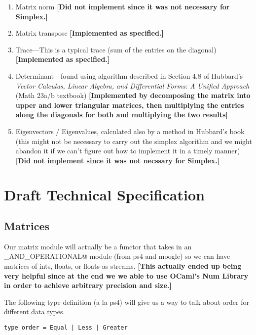 \documentclass[letterpaper,11pt]{article}
\newcommand{\annot}[1]{\textbf{\color{BrickRed} [#1]}}
\begin{document}
\begin{enumerate}
\item Matrix norm 
{\annot{Did not implement since it was not necessary for Simplex.}}

\item Matrix transpose
{\annot{Implemented as specified.}}

\item Trace---This is a typical trace (sum of the entries on the diagonal)
{\annot{Implemented as specified.}}

\item Determinant---found using algorithm described in Section 4.8 of Hubbard's
\emph{Vector Calculus, Linear Algebra, and Differential Forms: A Unified
Approach} (Math 23a/b textbook)
{\annot{Implemented by decomposing the matrix into upper and lower triangular
matrices, then multiplying the entries along the diagonals for both and
multiplying the two results}}

\item Eigenvectors / Eigenvalues, calculated also by a method in Hubbard's book
(this might not be necessary to carry out the simplex algorithm and we might
abandon it if we can't figure out how to implement it in a timely manner) 
{\annot{Did not implement since it was not necssary for Simplex.}}

\end{enumerate}

\section{Draft Technical Specification}

\subsection{Matrices}

Our matrix module will actually be a functor that takes in an
\verb@ORDERED_AND_OPERATIONAL@ module (from ps4 and moogle) so we can have
matrices of ints, floats, or floats as streams. 
{\annot{This actually ended up being very helpful since at the end we we able 
to use OCaml's Num Library in order to achieve arbitrary precision and size.}}

The following type definition (a la ps4) will give us a way to talk about order
for different data types.

\begin{verbatim}
type order = Equal | Less | Greater
\end{verbatim}
\end{document}
